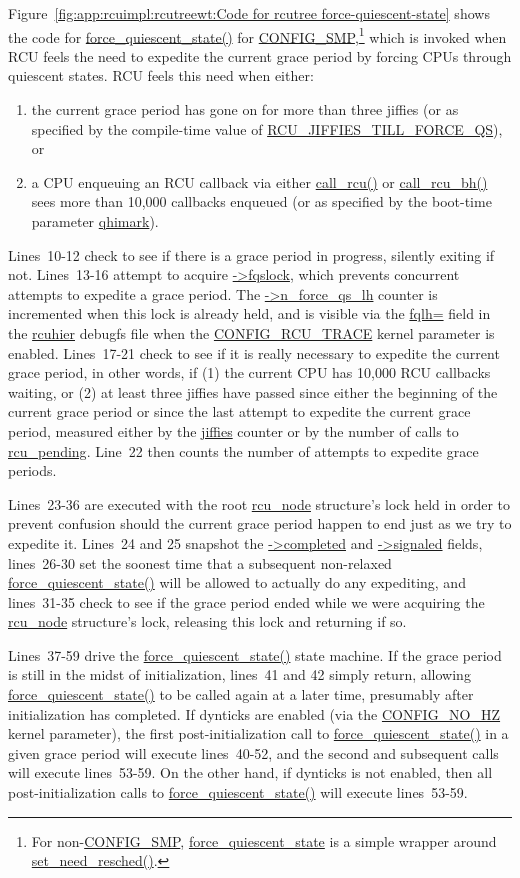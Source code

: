Figure~\ref{fig:app:rcuimpl:rcutreewt:Code for rcutree force-quiescent-state}
shows the code for \url{force_quiescent_state()} for
\url{CONFIG_SMP},\footnote{
	For non-\url{CONFIG_SMP}, \url{force_quiescent_state} is a
	simple wrapper around \url{set_need_resched()}.}
which is invoked when RCU feels the need to expedite the current
grace period by forcing CPUs through quiescent states.
RCU feels this need when either:
\begin{enumerate}
\item	the current grace period has gone on for more than three jiffies
	(or as specified by the compile-time value of
	\url{RCU_JIFFIES_TILL_FORCE_QS}), or
\item	a CPU enqueuing an RCU callback via either \url{call_rcu()}
	or \url{call_rcu_bh()} sees more than 10,000 callbacks enqueued
	(or as specified by the boot-time parameter \url{qhimark}).
\end{enumerate}

Lines~10-12 check to see if there is a grace period in progress,
silently exiting if not.
Lines~13-16 attempt to acquire \url{->fqslock}, which prevents concurrent
attempts to expedite a grace period.
The \url{->n_force_qs_lh} counter is incremented when this lock is
already held, and is visible via the \url{fqlh=} field
in the \url{rcuhier} debugfs file when the \url{CONFIG_RCU_TRACE} kernel
parameter is enabled.
Lines~17-21 check to see if it is really necessary to expedite the
current grace period, in other words, if (1) the current CPU has 10,000
RCU callbacks waiting, or (2) at least three jiffies have passed
since either the beginning of the current grace period or since the
last attempt to expedite the current grace period, measured either
by the \url{jiffies} counter or by the number of calls to
\url{rcu_pending}.
Line~22 then counts the number of attempts to expedite grace periods.

Lines~23-36 are executed with the root \url{rcu_node} structure's lock
held in order to prevent confusion should the current grace period
happen to end just as we try to expedite it.
Lines~24 and 25 snapshot the \url{->completed} and \url{->signaled} fields,
lines~26-30 set the soonest time that a subsequent non-relaxed
\url{force_quiescent_state()} will be allowed to actually do
any expediting, and lines~31-35 check to see if the grace period
ended while we were acquiring the \url{rcu_node} structure's lock,
releasing this lock and returning if so.

Lines~37-59 drive the \url{force_quiescent_state()} state machine.
If the grace period is still in the midst of initialization,
lines~41 and 42 simply return, allowing \url{force_quiescent_state()}
to be called again at a later time, presumably after initialization
has completed.
If dynticks are enabled (via the \url{CONFIG_NO_HZ} kernel
parameter), the first post-initialization call
to \url{force_quiescent_state()} in a given grace period will
execute lines~40-52, and the second and subsequent calls will
execute lines~53-59.
On the other hand, if dynticks is not enabled, then all post-initialization
calls to \url{force_quiescent_state()} will execute lines~53-59.

